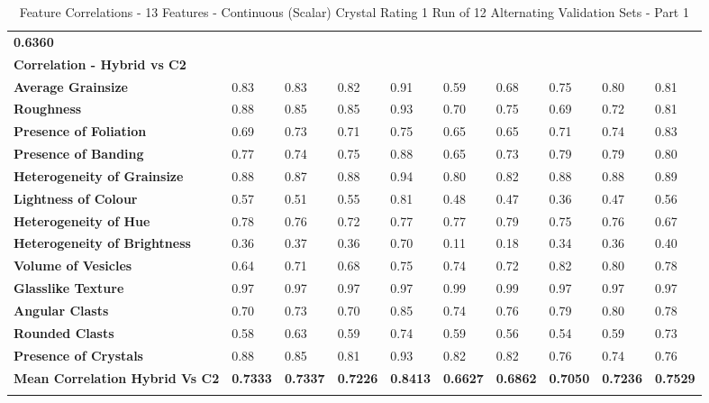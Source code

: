 \begin{longtable}[c]{@{}llllllllll@{}}
  \textbf{0.6360} \\
\rowcolor[HTML]{E7E6E6} 
\textbf{Correlation - Hybrid vs C2} &
  \textbf{} &
  \textbf{} &
  \textbf{} &
  \textbf{} &
  \textbf{} &
  \textbf{} &
  \textbf{} &
  \textbf{} &
  \textbf{} \\
\textbf{Average   Grainsize} &
  0.83 &
  0.83 &
  0.82 &
  0.91 &
  0.59 &
  0.68 &
  0.75 &
  0.80 &
  0.81 \\
\textbf{Roughness} &
  0.88 &
  0.85 &
  0.85 &
  0.93 &
  0.70 &
  0.75 &
  0.69 &
  0.72 &
  0.81 \\
\textbf{Presence of Foliation} &
  0.69 &
  0.73 &
  0.71 &
  0.75 &
  0.65 &
  0.65 &
  0.71 &
  0.74 &
  0.83 \\
\textbf{Presence of Banding} &
  0.77 &
  0.74 &
  0.75 &
  0.88 &
  0.65 &
  0.73 &
  0.79 &
  0.79 &
  0.80 \\
\textbf{Heterogeneity of Grainsize} &
  0.88 &
  0.87 &
  0.88 &
  0.94 &
  0.80 &
  0.82 &
  0.88 &
  0.88 &
  0.89 \\
\textbf{Lightness of Colour} &
  0.57 &
  0.51 &
  0.55 &
  0.81 &
  0.48 &
  0.47 &
  0.36 &
  0.47 &
  0.56 \\
\textbf{Heterogeneity of Hue} &
  0.78 &
  0.76 &
  0.72 &
  0.77 &
  0.77 &
  0.79 &
  0.75 &
  0.76 &
  0.67 \\
\textbf{Heterogeneity of Brightness} &
  0.36 &
  0.37 &
  0.36 &
  0.70 &
  0.11 &
  0.18 &
  0.34 &
  0.36 &
  0.40 \\
\textbf{Volume of Vesicles} &
  0.64 &
  0.71 &
  0.68 &
  0.75 &
  0.74 &
  0.72 &
  0.82 &
  0.80 &
  0.78 \\
\textbf{Glasslike Texture} &
  0.97 &
  0.97 &
  0.97 &
  0.97 &
  0.99 &
  0.99 &
  0.97 &
  0.97 &
  0.97 \\
\textbf{Angular Clasts} &
  0.70 &
  0.73 &
  0.70 &
  0.85 &
  0.74 &
  0.76 &
  0.79 &
  0.80 &
  0.78 \\
\textbf{Rounded Clasts} &
  0.58 &
  0.63 &
  0.59 &
  0.74 &
  0.59 &
  0.56 &
  0.54 &
  0.59 &
  0.73 \\
\textbf{Presence of Crystals} &
  0.88 &
  0.85 &
  0.81 &
  0.93 &
  0.82 &
  0.82 &
  0.76 &
  0.74 &
  0.76 \\
\cellcolor[HTML]{FFFF00}\textbf{Mean   Correlation Hybrid Vs C2} &
  \textbf{0.7333} &
  \textbf{0.7337} &
  \textbf{0.7226} &
  \cellcolor[HTML]{FFFF00}\textbf{0.8413} &
  \textbf{0.6627} &
  \textbf{0.6862} &
  \textbf{0.7050} &
  \textbf{0.7236} &
  \textbf{0.7529}
\\
\caption{Feature Correlations - 13 Features - Continuous (Scalar) Crystal Rating 1 Run of 12 Alternating Validation Sets - Part 1}\label{Feature Correlations - 13 Features - Continuous Scalar Crystal Rating 1 Run of 12 Alternating Validation Sets - Part 1}\\
\end{longtable}


